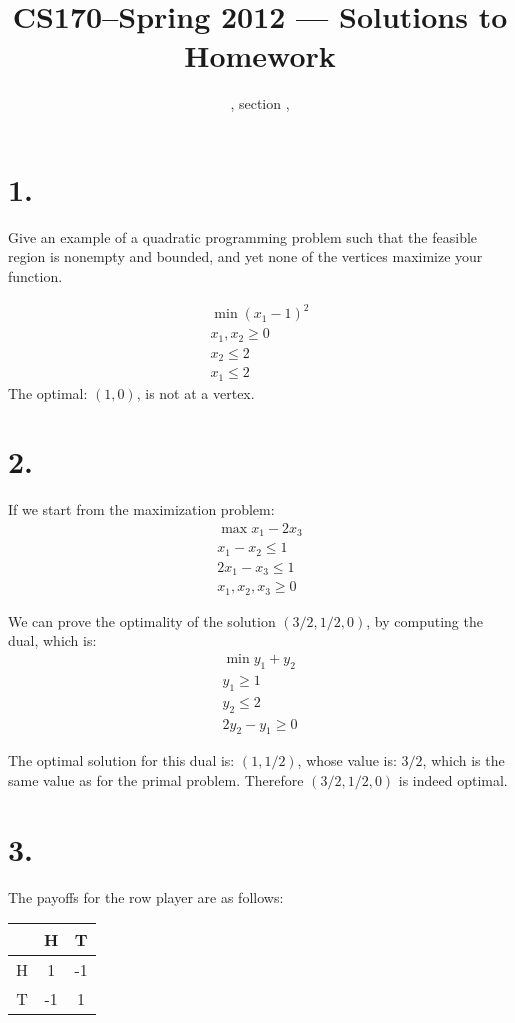 \documentclass[11pt]{article}
\title{CS170--Spring 2012 --- Solutions to Homework \HW}
\author{\Name, section \Sec, \texttt{\Login}}
\begin{document}
\maketitle

\section*{1.}
Give an example of a quadratic programming problem such that the feasible
region is nonempty and bounded, and yet none of the vertices maximize your
function. 

\begin{eqnarray*}
\min (x_1-1)^2 \\
x_1, x_2 \ge 0\\
x_2 \le 2\\
x_1 \le 2
\end{eqnarray*}
The optimal: $(1, 0)$, is not at a vertex. 


\newpage
\section*{2.}
If we start from the maximization problem:
\begin{eqnarray*}
\max x_1 - 2x_3\\
x_1 - x_2 \le 1\\
2x_1 - x_3 \le 1\\
x_1, x_2, x_3 \ge 0
\end{eqnarray*}

We can prove the optimality of the solution $(3/2, 1/2, 0)$, by computing the
dual, which is:
\begin{eqnarray*}
\min y_1 + y_2\\
y_1 \ge 1\\
y_2 \le 2\\
2y_2 - y_1 \ge 0
\end{eqnarray*}

The optimal solution for this dual is: $(1, 1/2)$, whose value is: $3/2$, which
is the same value as for the primal problem. Therefore $(3/2, 1/2, 0)$ is indeed
optimal.
\newpage
\section*{3.}
The payoffs for the row player are as follows:
\begin{tabular}[h]{c|c|c|}
&H&T\\
\hline
H&1&-1\\
\hline
T&-1&1\\
\hline
\end{tabular}
\end{document}
